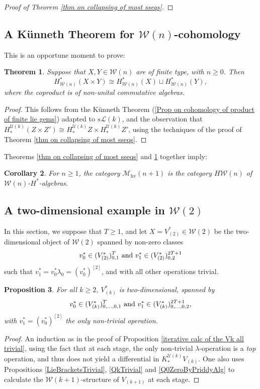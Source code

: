 \documentclass[11pt]{amsart} \renewcommand{\baselinestretch}{1.2}
\theoremstyle{plain}
\newtheorem{thm}{Theorem}[section] %
\newtheorem{prop}[thm]{Proposition}
\newtheorem{cor}[thm]{Corollary}
\numberwithin{equation}{section} %
\theoremstyle{plain}
\newtheorem{thm}{Theorem}[chapter] %
\newtheorem{prop}[thm]{Proposition}
\newtheorem{cor}[thm]{Corollary}
\numberwithin{equation}{chapter} %
\newcommand{\calU}{\mathcal{U}}
\newcommand{\calL}{\mathcal{L}}
\newcommand{\calw}{\mathcal{W}}
\newcommand{\calu}{\mathcal{U}}
\newcommand{\call}{\mathcal{L}}
\newcommand{\calMhv}{\mathcal{M}_\mathrm{hv}}
\newcommand{\restn}[1]{#1^{[2]}}
\newcommand{\HA}[1]{H#1}
\newcommand{\SubsectionOrSection}[1]{\subsection{#1}}
\begin{document}
\begin{Calculations of HWn}
\begin{proof}[Proof of Theorem \ref{thm on collapsing of most sseqs}]
\end{proof}
\SubsectionOrSection{A K\"unneth Theorem for $\calw(n)$-cohomology}
This is an opportune moment to prove:
\begin{thm}
\label{Koszul-dual Hilton-Milnor theorem}
Suppose that $X,Y\in\calw(n)$ are  of finite type, with $n\geq0$. Then 
\[H^*_{\calw(n)}(X\times Y)\cong H^*_{\calw(n)}(X)\sqcup H^*_{\calw(n)}(Y),\]
where the coproduct is of non-unital commutative algebras.
\end{thm}
\begin{proof}
This follows from the K\"unneth Theorem (\ref{Prop on cohomology of product of finite lie gems}) adapted to $s\call(k)$, and the observation that $H_*^{\calu(k)}(Z\times Z')\cong H_*^{\calu(k)}Z\times H_*^{\calu(k)}Z'$,
using the techniques of the proof of Theorem \ref{thm on collapsing of most sseqs}.
\end{proof}
Theorems \ref{thm on collapsing of most sseqs} and \ref{Koszul-dual Hilton-Milnor theorem} together imply:
\begin{cor}
\label{yeah it's Wn-coh-algs}
For $n\geq1$, the category $\calMhv(n+1)$ is the category $\HA{\calw(n)}$ of $\calw(n)$-$H^*$-algebras.
\end{cor}
\SubsectionOrSection{A two-dimensional example in $\calw(2)$}
In this section, we suppose that $T\geq1$, and let $X=V^*_{(2)}\in\calw(2)$ be the two-dimensional object of $\calw(2)$ spanned by non-zero classes 
\[v_{0}^{*}\in (V^*_{(2)})^{T}_{0,1}\textup{ and }v_{1}^{*}\in (V^*_{(2)})^{2T+1}_{0,2}\]
such that $v^*_{1}=v^*_0\lambda_{0}=\restn{(v^*_0)}$, and with all other operations trivial. 
\begin{prop}
\label{2d example in w2}
For all $k\geq2$, $V^*_{(k)}$ is two-dimensional, spanned by
\[v_{0}^{*}\in (V^*_{(k)})^{T}_{0,\ldots,0,1}\textup{ and }v_{1}^{*}\in (V^*_{(k)})^{2T+1}_{0,\ldots,0,2},\]
with  $v^*_{1}=\restn{(v^*_0)}$ the only non-trivial operation.
\end{prop}
\begin{proof}
An induction as in the proof of Proposition \ref{iterative calc of the Vk all trivial}, using the fact that at each stage, the only non-trivial $\lambda$-operation is a \emph{top} operation, and thus does not yield a differential in $K_*^{\calU(k)}V_{(k)}$. One also uses Propositions \ref{LieBracketsTrivial}, \ref{QkTrivial} and \ref{Q0ZeroByPriddyAlg} to calculate the $\calw(k+1)$-structure of $V_{(k+1)}$ at each stage.

\end{proof}
\end{Calculations of HWn}
\end{document}
